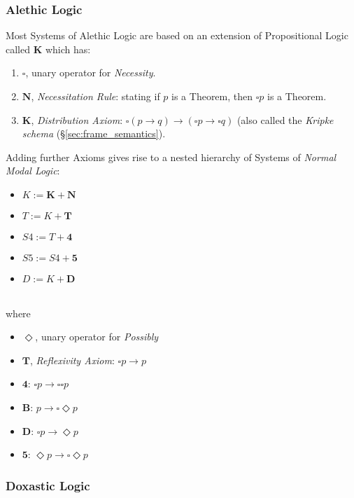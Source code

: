 \subsubsection{Alethic Logic}\label{sec:alethic_logic}

Most Systems of Alethic Logic are based on an extension of
Propositional Logic called $\mathbf{K}$ which has:

\begin{enumerate}
\item $\square$, unary operator for \emph{Necessity}.
\item $\mathbf{N}$, \emph{Necessitation Rule}: stating if $p$ is a
  Theorem, then $\square p$ is a Theorem.
\item $\mathbf{K}$, \emph{Distribution Axiom}: $\square(p \rightarrow
  q) \rightarrow (\square p \rightarrow \square q)$ (also called the
  \emph{Kripke schema} (\S\ref{sec:frame_semantics}).
\end{enumerate}

Adding further Axioms gives rise to a nested hierarchy of Systems of
\emph{Normal Modal Logic}:

\begin{itemize}
\item $K := \mathbf{K} + \mathbf{N}$
\item $T := K + \mathbf{T}$
\item $S4 := T + \mathbf{4}$
\item $S5 := S4 + \mathbf{5}$
\item $D := K + \mathbf{D}$
\end{itemize} \hfill \\
where

\begin{itemize}
\item $\Diamond$, unary operator for \emph{Possibly}
\item $\mathbf{T}$, \emph{Reflexivity Axiom}: $\square p \rightarrow p$
\item $\mathbf{4}$: $\square p \rightarrow \square \square p$
\item $\mathbf{B}$: $p \rightarrow \square \Diamond p$
\item $\mathbf{D}$: $\square p \rightarrow \Diamond p$
\item $\mathbf{5}$: $\Diamond p \rightarrow \square \Diamond p$
\end{itemize}



\subsubsection{Doxastic Logic}\label{sec:doxastic_logic}

